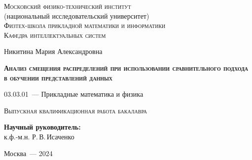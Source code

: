 \thispagestyle{empty}

\begin{titlepage}
    \begin{center}
        \textsc{Московский физико-технический институт}\\
        (национальный исследовательский университет)\\
        \textsc{Физтех-школа прикладной математики и информатики}\\
        \textsc{Кафедра интеллектуальных систем}
        \end{center}
        \vspace{2cm}
        \begin{center}
        {Никитина Мария Александровна}
        \par
        \vspace{2cm}
        {\Large \textsc{\textbf{Анализ смещения распределений при использовании сравнительного подхода в обучении представлений данных}}}
        \par
        \vspace{2cm}
        {03.03.01~--- Прикладные математика и физика}
        \par
        \vspace{2cm}
        \textsc{Выпускная квалификационная работа бакалавра}
        \end{center}
        \vspace{2cm}
        \hfill\parbox{8,4cm}{\textbf{Научный руководитель:}
        \\к.ф.-м.н. Р.\,В.\,Исаченко}
        \par
        \vspace{2.5cm}
        \begin{center}
        {Москва~--- 2024}
    \end{center}
\end{titlepage}